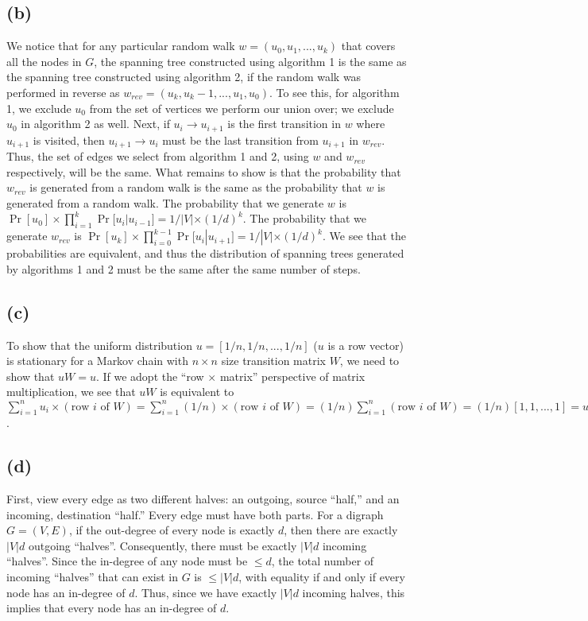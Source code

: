 \documentclass{6046}
\begin{document}
\subsection*{(b)}
We notice that for any particular random walk
$w = (u_0, u_1, ..., u_k)$ that covers all the nodes in $G$, 
the spanning tree constructed using algorithm 1 is the same
as the spanning tree constructed using algorithm 2, if
the random walk was performed in reverse as $w_{rev} =
(u_k, u_k-1, ..., u_1, u_0)$. To see this, for algorithm 1,
we exclude $u_0$ from the set of vertices we perform our
union over; we exclude $u_0$ in algorithm 2 as well. Next,
if $u_i \rightarrow u_{i + 1}$ is the first transition in $w$
where $u_{i + 1}$ is visited, then $u_{i + 1} \rightarrow u_{i}$
must be the last transition from $u_{i + 1}$ in $w_{rev}$. Thus,
the set of edges we select from algorithm 1 and 2,
using $w$ and $w_{rev}$ respectively, will be the same. What
remains to show is that the probability that $w_{rev}$ is 
generated from a random walk is the same as the
probability that $w$ is generated from a random walk. The
probability that we generate $w$ is $\Pr[u_0] \times
\prod_{i = 1}^k \Pr[u_i | u_{i - 1}] = 1/|V|
\times (1/d)^k$. The probability
that we generate $w_{rev}$ is $\Pr[u_k] \times
\prod_{i = 0}^{k - 1}\Pr[u_i | u_{i + 1}] = 1/|V|
\times (1/d)^k$. We see that the probabilities are
equivalent, and thus the distribution of spanning
trees generated by algorithms 1 and 2 must be the same
after the same number of steps.

\subsection*{(c)}
To show that the uniform distribution $u = [1/n, 1/n, ..., 1/n]$
($u$ is a row vector) is stationary for a
Markov chain with $n \times n$ size
transition matrix $W$, we need to show that $uW = u$. If
we adopt the ``row $\times$ matrix'' perspective of matrix
multiplication, we see that $uW$ is equivalent
to $\sum_{i = 1}^{n} u_i \times (\text{row $i$ of $W$}) = 
\sum_{i = 1}^n (1/n) \times (\text{row $i$ of $W$}) = 
(1/n) \sum_{i = 1}^n (\text{row $i$ of $W$}) =
(1/n) [1, 1, ..., 1] = u$.

\subsection*{(d)}
First, view every edge as two different halves: an outgoing, source
``half,'' and an incoming, destination ``half.'' Every
edge must have both parts. For a digraph
$G = (V, E)$, if the out-degree of every node is
exactly $d$, then there are exactly $|V|d$ outgoing ``halves''.
Consequently, there must be exactly $|V|d$ incoming ``halves''.
Since the in-degree of any node must be $\le d$, the
total number of incoming ``halves'' that can exist in $G$
is $\le |V|d$, with equality if and only if every node has
an in-degree of $d$. Thus, since we have exactly $|V|d$ incoming
halves, this implies that every node has an in-degree of $d$.
\end{document}
